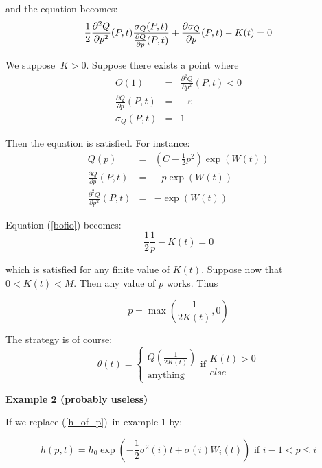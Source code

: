 \documentclass{article}
\begin{document}
and the equation becomes:%
\begin{equation}
\frac{1}{2}\frac{\partial ^{2}Q}{\partial p^{2}}(P,t)\frac{\sigma _{Q}(P,t)}{%
\frac{\partial Q}{\partial p}(P,t)}+\frac{\partial \sigma _{Q}}{\partial p}%
(P,t)-K(t)=0  \label{bofio}
\end{equation}

We suppose $\ K>0$. Suppose there exists a point where 
\begin{eqnarray*}
O(1) &=&\frac{\partial ^{2}Q}{\partial p^{2}}(P,t)<0 \\
\frac{\partial Q}{\partial p}(P,t) &=&-\varepsilon \\
\sigma _{Q}(P,t) &=&1
\end{eqnarray*}

Then the equation is satisfied. For instance:%
\begin{eqnarray*}
Q(p) &=&(C-\frac{1}{2}p^{2})\exp (W(t)) \\
\frac{\partial Q}{\partial p}(P,t) &=&-p\exp (W(t)) \\
\frac{\partial ^{2}Q}{\partial p^{2}}(P,t) &=&-\exp (W(t))
\end{eqnarray*}

Equation (\ref{bofio}) becomes:%
\begin{equation*}
\frac{1}{2}\frac{1}{p}-K(t)=0
\end{equation*}

which is satisfied for any finite value of $K(t)$. Suppose now that $%
0<K(t)<M $. Then any value of $p$ works. Thus

\begin{equation*}
p=\max (\frac{1}{2K(t)},0)
\end{equation*}

The strategy is of course:%
\begin{equation*}
\theta (t)=\left\{ 
\begin{array}{c}
Q(\frac{1}{2K(t)}) \\ 
\text{anything}%
\end{array}%
\right. \text{if}%
\begin{array}{c}
K(t)>0 \\ 
else%
\end{array}%
\end{equation*}

\bigskip

\textbf{Example 2 (probably useless)}

If we replace (\ref{h_of_p})\ in example 1 by:

\begin{equation*}
h(p,t)=h_{0}\exp (-\frac{1}{2}\sigma ^{2}(i)t+\sigma (i)W_{i}(t))\text{ if }%
i-1<p\leq i
\end{equation*}%
\bigskip
\end{document}
